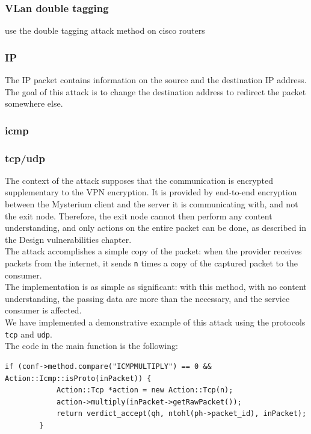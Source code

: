 \documentclass[12pt]{article}
\begin{document}
	\subsubsection{VLan double tagging}
	use the double tagging attack method on cisco routers


	\subsubsection{IP}
	The IP packet contains information on the source and the destination IP address. The goal of this attack is to change the destination address to redirect the packet somewhere else.\\
	

	\subsubsection{icmp}

	\subsubsection{tcp/udp}
	
	The context of the attack supposes that the communication is encrypted supplementary to the VPN encryption. It is provided by end-to-end encryption between the Mysterium client and the server it is communicating with, and not the exit node. Therefore, the exit node cannot then perform any content understanding, and only actions on the entire packet can be done, as described in the Design vulnerabilities chapter.\\
	The attack accomplishes a simple copy of the packet: when the provider receives packets from the internet, it sends \lstinline{n} times a copy of the captured packet to the consumer.\\
	The implementation is as simple as significant: with this method, with no content understanding, the passing data are more than the necessary, and the service consumer is affected.\\
	\bigbreak
	We have implemented a demonstrative example of this attack using the protocols \lstinline{tcp} and \lstinline{udp}.\\

	The code in the main function is the following:\\
	\begin{lstlisting}[frame=single]
		if (conf->method.compare("ICMPMULTIPLY") == 0 && Action::Icmp::isProto(inPacket)) {
			Action::Tcp *action = new Action::Tcp(n);
			action->multiply(inPacket->getRawPacket());
			return verdict_accept(qh, ntohl(ph->packet_id), inPacket);
		}
	\end{lstlisting}
\end{document}
